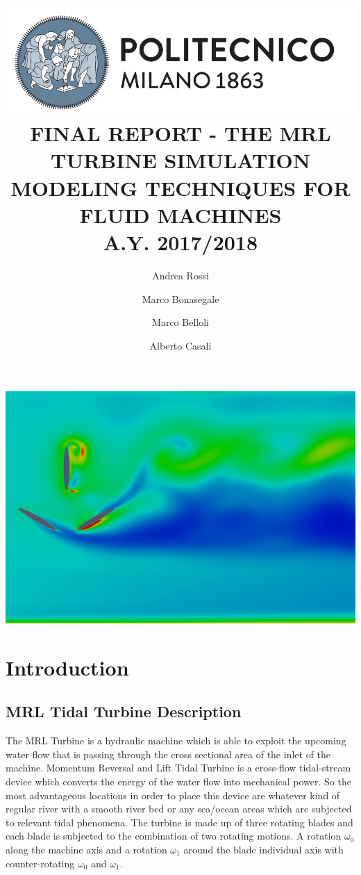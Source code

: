 \documentclass[a4paper,12pt]{article}
\title{
\includegraphics[scale=0.4]{images/logo.png}
\\[1cm]
FINAL REPORT - THE MRL TURBINE SIMULATION
\\
MODELING TECHNIQUES FOR FLUID MACHINES 
\\
A.Y. 2017/2018}
\author{
Andrea Rossi \and Marco Bonasegale
\and Marco Belloli \and Alberto Casali
}
\date{}
\begin{document}
\maketitle
\begin{center}
\includegraphics[width=\textwidth]{images/cover.png}
\end{center}

\newpage

\tableofcontents

\newpage

\section{Introduction}

\subsection{MRL Tidal Turbine Description}
The MRL Turbine is a hydraulic machine which is able to exploit the upcoming  water flow that is passing through the cross sectional area of the inlet of the machine. Momentum Reversal and Lift Tidal Turbine is a cross-flow tidal-stream device which converts the energy of the water
flow into mechanical power. So the most advantageous locations in order to place this device are whatever kind of regular river with a smooth river bed or any sea/ocean areas which are subjected to relevant tidal phenomena.
The turbine is made up of three rotating blades and each blade is subjected to the combination of two rotating motions. A rotation $\omega_0$ along the machine axis  and a rotation $\omega_1$ around the blade individual axis with counter-rotating $\omega_0$ and $\omega_1$.
\end{document}
